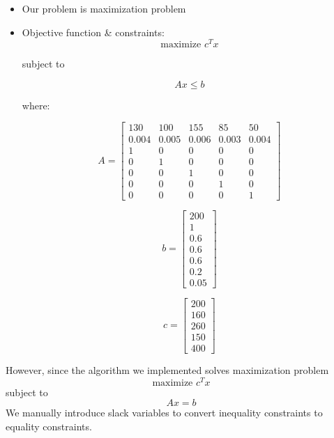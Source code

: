 \documentclass{article}
\begin{document}
\begin{itemize}
    \item Our problem is maximization problem
    \item Objective function \& constraints:
          \[
              \text{maximize } c^T x
          \]

          subject to

          \[
              Ax \leq b
          \]

          where:

          \[
              A = \begin{bmatrix}
                  130   & 100   & 155   & 85    & 50    \\
                  0.004 & 0.005 & 0.006 & 0.003 & 0.004 \\
                  1     & 0     & 0     & 0     & 0     \\
                  0     & 1     & 0     & 0     & 0     \\
                  0     & 0     & 1     & 0     & 0     \\
                  0     & 0     & 0     & 1     & 0     \\
                  0     & 0     & 0     & 0     & 1
              \end{bmatrix}
          \]

          \[
              b = \begin{bmatrix}
                  200 \\
                  1   \\
                  0.6 \\
                  0.6 \\
                  0.6 \\
                  0.2 \\
                  0.05
              \end{bmatrix}
          \]

          \[
              c = \begin{bmatrix}
                  200 \\
                  160 \\
                  260 \\
                  150 \\
                  400
              \end{bmatrix}
          \]
\end{itemize}

However, since the algorithm we implemented solves maximization problem
\[
    \text{maximize } c^T x
\]
subject to
\[
    Ax = b
\]
We manually introduce slack variables to convert inequality constraints to
equality constraints.
\end{document}
